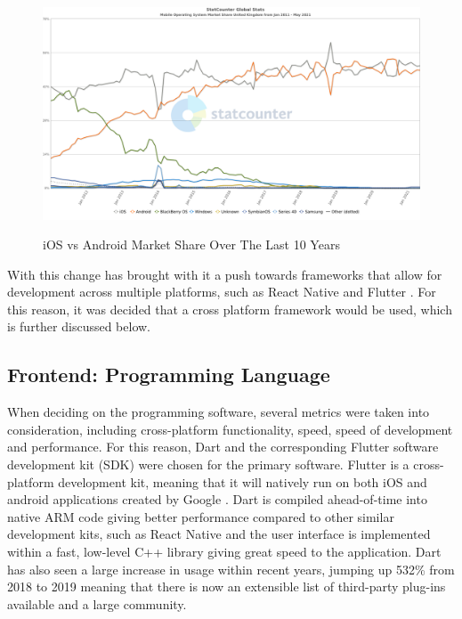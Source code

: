 \documentclass[12pt]{article}
\begin{document}
	\begin{figure}[H]
		\centering
		\includegraphics[scale=0.4]{images/ios-android.png}
		\caption{iOS vs Android Market Share Over The Last 10 Years}
		\label{fig:ios-android}
		\cite{AndroidVsIOS2021}
	\end{figure}
	
	With this change has brought with it a push towards frameworks that allow for development across multiple platforms, such as React Native \cite{ReactNativeLearn} and Flutter \cite{FlutterBeautifulNative}. For this reason, it was decided that a cross platform framework would be used, which is further discussed below.
	
	\subsection{Frontend: Programming Language}
	When deciding on the programming software, several metrics were taken into consideration, including cross-platform functionality, speed, speed of development and performance. For this reason, Dart and the corresponding Flutter software development kit (SDK) were chosen for the primary software. Flutter is a cross-platform development kit, meaning that it will natively run on both iOS and android applications created by Google \cite{FlutterBeautifulNative}. Dart is compiled ahead-of-time into native ARM code giving better performance compared to other similar development kits, such as React Native and the user interface  is implemented within a fast, low-level C++ library giving great speed to the application. Dart has also seen a large increase in usage within recent years, jumping up 532\% from 2018 to 2019 \cite{StateOctoverse2019} meaning that there is now an extensible list of third-party plug-ins available and a large community.
	
\end{document}
